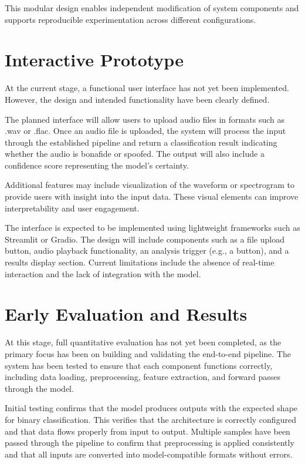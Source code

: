 \documentclass[conference]{IEEEtran}
\begin{document}
This modular design enables independent modification of system components and supports reproducible experimentation across different configurations.

\section{Interactive Prototype}
At the current stage, a functional user interface has not
yet been implemented. However, the design and intended
functionality have been clearly defined.

The planned interface will allow users to upload audio files
in formats such as .wav or .flac. Once an audio file is uploaded,
the system will process the input through the established
pipeline and return a classification result indicating whether
the audio is bonafide or spoofed. The output will also include
a confidence score representing the model’s certainty.

Additional features may include visualization of the waveform
or spectrogram to provide users with insight into the
input data. These visual elements can improve interpretability
and user engagement.

The interface is expected to be implemented using
lightweight frameworks such as Streamlit or Gradio. The
design will include components such as a file upload button,
audio playback functionality, an analysis trigger (e.g., a button),
and a results display section. Current limitations include
the absence of real-time interaction and the lack of integration
with the model.

\section{Early Evaluation and Results}

At this stage, full quantitative evaluation has not yet been
completed, as the primary focus has been on building and
validating the end-to-end pipeline. The system has been tested
to ensure that each component functions correctly, including
data loading, preprocessing, feature extraction, and forward
passes through the model.

Initial testing confirms that the model produces outputs with
the expected shape for binary classification. This verifies that
the architecture is correctly configured and that data flows
properly from input to output. Multiple samples have been
passed through the pipeline to confirm that preprocessing is
applied consistently and that all inputs are converted into
model-compatible formats without errors.
\end{document}
